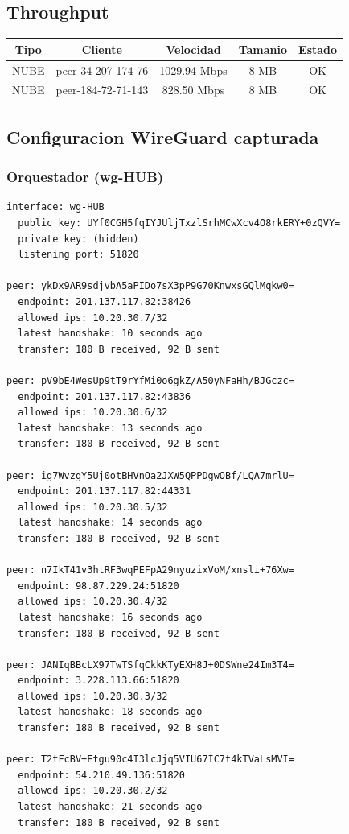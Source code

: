 \documentclass[11pt,a4paper]{article}
\begin{document}
\subsection{Throughput}
\begin{longtable}{|c|c|c|c|c|}
\hline
Tipo & Cliente & Velocidad & Tamanio & Estado \\ \hline
NUBE & peer-34-207-174-76 & 1029.94 Mbps & 8 MB & OK \\ \hline
NUBE & peer-184-72-71-143 & 828.50 Mbps & 8 MB & OK \\ \hline
\end{longtable}

\subsection{Configuracion WireGuard capturada}
\subsubsection*{Orquestador (wg-HUB)}
\begin{lstlisting}
interface: wg-HUB
  public key: UYf0CGH5fqIYJUljTxzlSrhMCwXcv4O8rkERY+0zQVY=
  private key: (hidden)
  listening port: 51820

peer: ykDx9AR9sdjvbA5aPIDo7sX3pP9G70KnwxsGQlMqkw0=
  endpoint: 201.137.117.82:38426
  allowed ips: 10.20.30.7/32
  latest handshake: 10 seconds ago
  transfer: 180 B received, 92 B sent

peer: pV9bE4WesUp9tT9rYfMi0o6gkZ/A50yNFaHh/BJGczc=
  endpoint: 201.137.117.82:43836
  allowed ips: 10.20.30.6/32
  latest handshake: 13 seconds ago
  transfer: 180 B received, 92 B sent

peer: ig7WvzgY5Uj0otBHVnOa2JXW5QPPDgwOBf/LQA7mrlU=
  endpoint: 201.137.117.82:44331
  allowed ips: 10.20.30.5/32
  latest handshake: 14 seconds ago
  transfer: 180 B received, 92 B sent

peer: n7IkT41v3htRF3wqPEFpA29nyuzixVoM/xnsli+76Xw=
  endpoint: 98.87.229.24:51820
  allowed ips: 10.20.30.4/32
  latest handshake: 16 seconds ago
  transfer: 180 B received, 92 B sent

peer: JANIqBBcLX97TwTSfqCkkKTyEXH8J+0DSWne24Im3T4=
  endpoint: 3.228.113.66:51820
  allowed ips: 10.20.30.3/32
  latest handshake: 18 seconds ago
  transfer: 180 B received, 92 B sent

peer: T2tFcBV+Etgu90c4I3lcJjq5VIU67IC7t4kTVaLsMVI=
  endpoint: 54.210.49.136:51820
  allowed ips: 10.20.30.2/32
  latest handshake: 21 seconds ago
  transfer: 180 B received, 92 B sent

\end{lstlisting}
\end{document}
